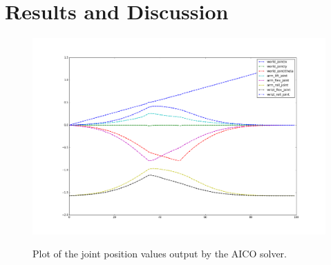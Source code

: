 \documentclass[11pt]{article}
\begin{document}
    \section{Results and Discussion}
        \begin{figure}
            \centering
            \includegraphics[width=0.95\linewidth]{2020.03.31/Solver_figure_positions.png}
            \label{fig:aicoOutput}
            \caption{Plot of the joint position values output by the AICO solver.}
        \end{figure}
\end{document}
